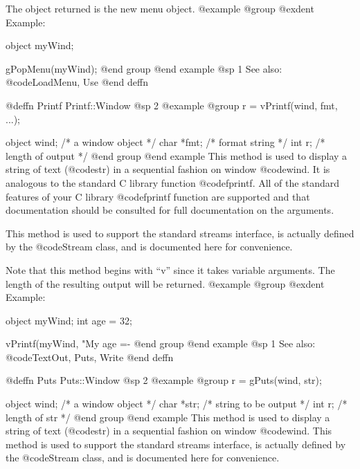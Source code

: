 The object returned is the new menu object.
@example
@group
@exdent Example:

object  myWind;

gPopMenu(myWind);
@end group
@end example
@sp 1
See also:  @code{LoadMenu, Use}
@end deffn











@deffn {Printf} Printf::Window
@sp 2
@example
@group
r = vPrintf(wind, fmt, ...);

object   wind;  /*  a window object       */
char    *fmt;   /*  format string         */
int      r;     /*  length of output      */
@end group
@end example
This method is used to display a string of text (@code{str}) in a sequential
fashion on window @code{wind}.  It is analogous to the standard C library
function @code{fprintf}.  All of the standard features of your C library
@code{fprintf} function are supported and that documentation should be
consulted for full documentation on the arguments.

This method is used to support the standard streams interface, is
actually defined by the @code{Stream} class, and is documented here for
convenience.

Note that this method begins with ``v'' since it takes variable arguments.
The length of the resulting output will be returned.
@example
@group
@exdent Example:

object  myWind;
int     age = 32;

vPrintf(myWind, "My age =- %
@end group
@end example
@sp 1
See also:  @code{TextOut, Puts, Write}
@end deffn



















@deffn {Puts} Puts::Window
@sp 2
@example
@group
r = gPuts(wind, str);

object   wind;  /*  a window object       */
char    *str;   /*  string to be output   */
int      r;     /*  length of str         */
@end group
@end example
This method is used to display a string of text (@code{str}) in a sequential
fashion on window @code{wind}.  This method is used to support the standard
streams interface, is actually defined by the @code{Stream} class, and
is documented here for convenience.

